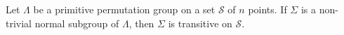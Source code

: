 Let $\Lambda$ be a primitive permutation group on a set $\mathcal{S}$ of $n$ points. If $\Sigma$ is a non-trivial normal subgroup of $\Lambda$, then $\Sigma$ is transitive on $\mathcal{S}$.
